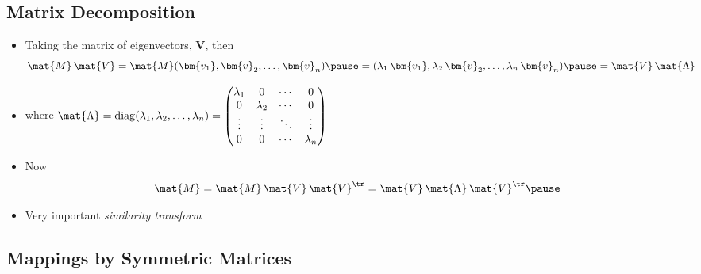 \begin{slide}
\section[-2]{Matrix Decomposition}

\begin{PauseHighLight}
  \begin{itemize}
  \item Taking the matrix of eigenvectors, $\bm{V}$, then
    \begin{align*}
      \mat{M}\, \mat{V}  &= \mat{M} (\bm{v_1},\bm{v}_2,\ldots,\bm{v}_n)\pause
      =
      (\lambda_1\,\bm{v_1},\lambda_2\,\bm{v}_2,\ldots,\lambda_n\,\bm{v}_n)\pause
      = \mat{V} \,\mat{\Lambda}
    \end{align*}
  \item where $\mat{\Lambda} = \mathrm{diag}(\lambda_1,
    \lambda_2,\ldots, \lambda_n) =
    \begin{pmatrix}
      \lambda_1 & 0 & \cdots & 0 \\
      0 & \lambda_2  & \cdots & 0 \\
      \vdots & \vdots &\ddots &\vdots \\
      0 & 0 & \cdots & \lambda_n
    \end{pmatrix}$\pause
  \item Now
    \begin{align*}
      \mat{M} = \mat{M}\, \mat{V} \, \mat{V}^\tr = \mat{V}
      \,\mat{\Lambda} \, \mat{V}^\tr \pause
    \end{align*}
  \item Very important \textit{similarity transform}\pause
  \end{itemize}
\end{PauseHighLight}

\end{slide}



\begin{slide}
\section[-2]{Mappings by Symmetric Matrices}

\pb \pause{}
\begin{center}
  \pause
\end{center}
\end{slide}


